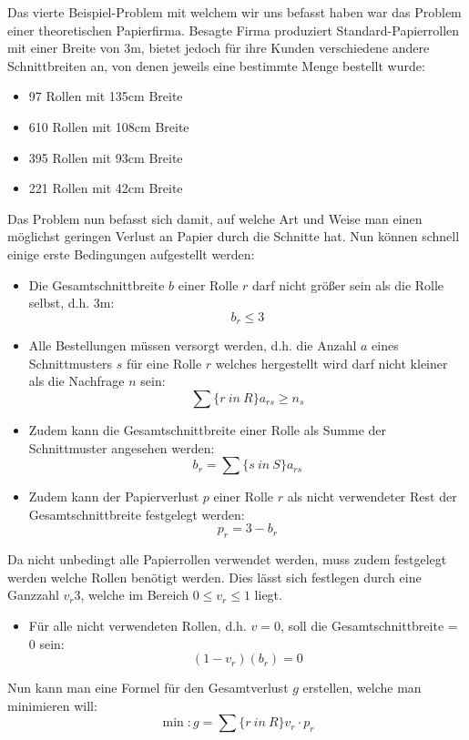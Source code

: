 Das vierte Beispiel-Problem mit welchem wir uns befasst haben war das Problem einer theoretischen Papierfirma. Besagte Firma produziert Standard-Papierrollen mit einer Breite von 3m, bietet jedoch für ihre Kunden verschiedene andere Schnittbreiten an, von denen jeweils eine bestimmte Menge bestellt wurde:
\begin{itemize}
\item 97 Rollen mit 135cm Breite
\item 610  Rollen mit 108cm Breite
\item 395  Rollen mit 93cm Breite
\item 221  Rollen mit 42cm Breite
\end{itemize}

Das Problem nun befasst sich damit, auf welche Art und Weise man einen möglichst geringen Verlust an Papier durch die Schnitte hat.
Nun können schnell einige erste Bedingungen aufgestellt werden:

\begin{itemize}
\item Die Gesamtschnittbreite $b$ einer Rolle $r$ darf nicht größer sein als die Rolle selbst, d.h. 3m: 
\[ b_r \leq 3 \]
\item Alle Bestellungen müssen versorgt werden, d.h. die Anzahl $a$ eines Schnittmusters $s$ für eine Rolle $r$ welches hergestellt wird darf nicht kleiner als die Nachfrage $n$ sein:
\[ \sum\{r~in~R\} a_{rs} \geq n_{s} \]
\item Zudem kann die Gesamtschnittbreite einer Rolle als Summe der Schnittmuster angesehen werden:
\[ b_r = \sum\{s~in~S\}a_{rs} \]
\item Zudem kann der Papierverlust $p$ einer Rolle $r$ als nicht verwendeter Rest der Gesamtschnittbreite festgelegt werden:
\[ p_r = 3 - b_r \]
\end{itemize}

Da nicht unbedingt alle Papierrollen verwendet werden, muss zudem festgelegt werden welche Rollen benötigt werden. Dies lässt sich festlegen durch eine Ganzzahl $v_r3$, welche im Bereich $0 \leq v_r \leq 1$ liegt.

\begin{itemize}
\item Für alle nicht verwendeten Rollen, d.h. $v = 0$, soll die Gesamtschnittbreite = 0 sein:
\[ (1 - v_r)(b_r) = 0 \]
\end{itemize}

Nun kann man eine Formel für den Gesamtverlust $g$ erstellen, welche man minimieren will:
\[\min: g = \sum\{r~in~R\}v_r \cdot p_r\]